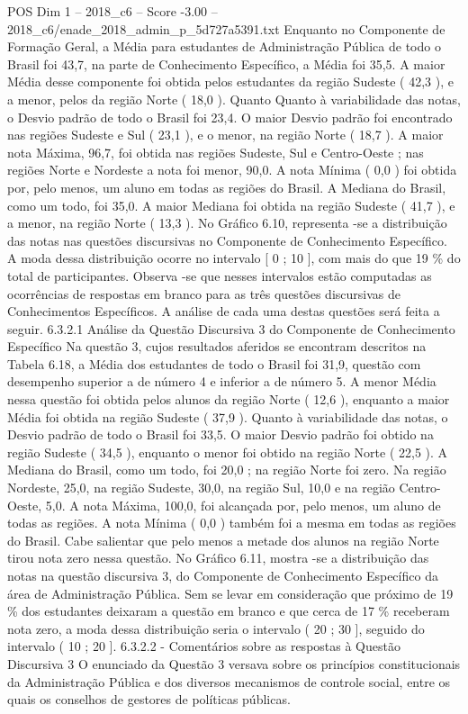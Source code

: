 \begin{textsample}{POS Dim 1 – 2018\_c6 – Score -3.00 – 2018\_c6/enade\_2018\_admin\_p\_5d727a5391.txt}
Enquanto no Componente de Formação Geral, a Média para estudantes de Administração Pública de todo o Brasil foi 43,7, na parte de Conhecimento Específico, a Média foi 35,5.
A maior Média desse componente foi obtida pelos estudantes da região Sudeste ( 42,3 ), e a menor, pelos da região Norte ( 18,0 ).
Quanto Quanto à variabilidade das notas, o Desvio padrão de todo o Brasil foi 23,4.
O maior Desvio padrão foi encontrado nas regiões Sudeste e Sul ( 23,1 ), e o menor, na região Norte ( 18,7 ).
A maior nota Máxima, 96,7, foi obtida nas regiões Sudeste, Sul e Centro-Oeste ; nas regiões Norte e Nordeste a nota foi menor, 90,0.
A nota Mínima ( 0,0 ) foi obtida por, pelo menos, um aluno em todas as regiões do Brasil.
A Mediana do Brasil, como um todo, foi 35,0.
A maior Mediana foi obtida na região Sudeste ( 41,7 ), e a menor, na região Norte ( 13,3 ).
No Gráfico 6.10, representa -se a distribuição das notas nas questões discursivas no Componente de Conhecimento Específico.
A moda dessa distribuição ocorre no intervalo [ 0 ; 10 ], com mais do que 19 \% do total de participantes.
Observa -se que nesses intervalos estão computadas as ocorrências de respostas em branco para as três questões discursivas de Conhecimentos Específicos.
A análise de cada uma destas questões será feita a seguir. 6.3.2.1 Análise da Questão Discursiva 3 do Componente de Conhecimento Específico Na questão 3, cujos resultados aferidos se encontram descritos na Tabela 6.18, a Média dos estudantes de todo o Brasil foi 31,9, questão com desempenho superior a de número 4 e inferior a de número 5.
A menor Média nessa questão foi obtida pelos alunos da região Norte ( 12,6 ), enquanto a maior Média foi obtida na região Sudeste ( 37,9 ).
Quanto à variabilidade das notas, o Desvio padrão de todo o Brasil foi 33,5.
O maior Desvio padrão foi obtido na região Sudeste ( 34,5 ), enquanto o menor foi obtido na região Norte ( 22,5 ).
A Mediana do Brasil, como um todo, foi 20,0 ; na região Norte foi zero.
Na região Nordeste, 25,0, na região Sudeste, 30,0, na região Sul, 10,0 e na região Centro-Oeste, 5,0.
A nota Máxima, 100,0, foi alcançada por, pelo menos, um aluno de todas as regiões.
A nota Mínima ( 0,0 ) também foi a mesma em todas as regiões do Brasil.
Cabe salientar que pelo menos a metade dos alunos na região Norte tirou nota zero nessa questão.
No Gráfico 6.11, mostra -se a distribuição das notas na questão discursiva 3, do Componente de Conhecimento Específico da área de Administração Pública.
Sem se levar em consideração que próximo de 19 \% dos estudantes deixaram a questão em branco e que cerca de 17 \% receberam nota zero, a moda dessa distribuição seria o intervalo ( 20 ; 30 ], seguido do intervalo ( 10 ; 20 ]. 6.3.2.2 - Comentários sobre as respostas à Questão Discursiva 3 O enunciado da Questão 3 versava sobre os princípios constitucionais da Administração Pública e dos diversos mecanismos de controle social, entre os quais os conselhos de gestores de políticas públicas.

\end{textsample}
